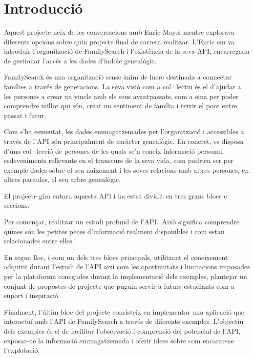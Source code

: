 \section{Introducció}

    \paragraph{}
    Aquest projecte neix de les conversacions amb Enric Mayol mentre explorava diferents opcions sobre quin projecte final de carrera realitzar. L’Enric em va introduir l'organització de FamilySearch i l'existència de la seva \gls{API}, encarregada de gestionar l’accés a les dades d’índole genealògic.

    \gls{FamilySearch} és una organització sense ànim de lucre destinada a connectar famílies a través de generacions. La seva visió com a col·lectiu és el d'ajudar a les persones a crear un vincle amb els seus avantpassats, com a eina per poder comprendre millor qui són, crear un sentiment de família i teixir el pont entre passat i futur.

    Com s'ha esmentat, les dades emmagatzemades per l'organització i accessibles a través de l'\gls{API} són principalment de caràcter genealògic. En concret, es disposa d'una col·lecció de persones de les quals se'n coneix informació personal, esdeveniments rellevants en el transcurs de la seva vida, com podrien ser per exemple dades sobre el seu naixement i les seves relacions amb altres persones, en altres paraules, el seu arbre genealògic.

    El projecte gira entorn aquesta \gls{API} i ha estat dividit en tres grans blocs o seccions.

    Per començar, realitzar un estudi profund de l'\gls{API}.\ Això significa comprendre quines són les petites peces d’informació realment disponibles i com estan relacionades entre elles.

    En segon lloc, i com un dels tres blocs principals, utilitzant el coneixement adquirit durant l’estudi de l'\gls{API} així com les oportunitats i limitacions imposades per la plataforma conegudes durant la implementació dels exemples, plantejar un conjunt de propostes de projecte que puguin servir a futurs estudiants com a suport i inspiració.

    Finalment, l’últim bloc del projecte consisteix en implementar una aplicació que interactuí amb l'\gls{API} de FamilySearch a través de diferents exemples. L'objectiu dels exemples és el de facilitar l'observació i comprensió del potencial de l'\gls{API}, exposar-ne la informació emmagatzemada i oferir idees sobre com encarar-ne l'explotació.
